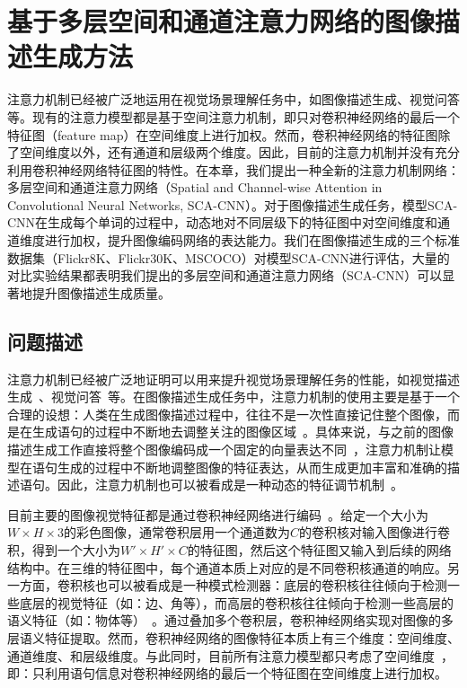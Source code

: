 \chapter{基于多层空间和通道注意力网络的图像描述生成方法}

注意力机制已经被广泛地运用在视觉场景理解任务中，如图像描述生成、视觉问答等。现有的注意力模型都是基于空间注意力机制，即只对卷积神经网络的最后一个特征图（feature map）在空间维度上进行加权。然而，卷积神经网络的特征图除了空间维度以外，还有通道和层级两个维度。因此，目前的注意力机制并没有充分利用卷积神经网络特征图的特性。在本章，我们提出一种全新的注意力机制网络：多层空间和通道注意力网络（Spatial and Channel-wise Attention in Convolutional Neural Networks, SCA-CNN）。对于图像描述生成任务，模型SCA-CNN在生成每个单词的过程中，动态地对不同层级下的特征图中对空间维度和通道维度进行加权，提升图像编码网络的表达能力。我们在图像描述生成的三个标准数据集（Flickr8K、Flickr30K、MSCOCO）对模型SCA-CNN进行评估，大量的对比实验结果都表明我们提出的多层空间和通道注意力网络（SCA-CNN）可以显著地提升图像描述生成质量。


\section{问题描述}

注意力机制已经被广泛地证明可以用来提升视觉场景理解任务的性能，如视觉描述生成~\cite{xu2015show,yao2015describing}、视觉问答~\cite{chen2016abc,yang2016stacked,xu2016ask}等。在图像描述生成任务中，注意力机制的使用主要是基于一个合理的设想：人类在生成图像描述过程中，往往不是一次性直接记住整个图像，而是在生成语句的过程中不断地去调整关注的图像区域~\cite{corbetta2002control}。具体来说，与之前的图像描述生成工作直接将整个图像编码成一个固定的向量表达不同~\cite{vinyals2015show,karpathy2015deep}，注意力机制让模型在语句生成的过程中不断地调整图像的特征表达，从而生成更加丰富和准确的描述语句。因此，注意力机制也可以被看成是一种动态的特征调节机制~\cite{mnih2014recurrent,stollenga2014deep}。

目前主要的图像视觉特征都是通过卷积神经网络进行编码~\cite{he2016deep,simonyan2015very}。给定一个大小为$W\times H\times 3$的彩色图像，通常卷积层用一个通道数为$C$的卷积核对输入图像进行卷积，得到一个大小为$W'\times H'\times C$的特征图，然后这个特征图又输入到后续的网络结构中。在三维的特征图中，每个通道本质上对应的是不同卷积核通道的响应。另一方面，卷积核也可以被看成是一种模式检测器：底层的卷积核往往倾向于检测一些底层的视觉特征（如：边、角等），而高层的卷积核往往倾向于检测一些高层的语义特征（如：物体等）~\cite{zeiler2014visualizing}。通过叠加多个卷积层，卷积神经网络实现对图像的多层语义特征提取。然而，卷积神经网络的图像特征本质上有三个维度：空间维度、通道维度、和层级维度。与此同时，目前所有注意力模型都只考虑了空间维度~\cite{xu2015show}，即：只利用语句信息对卷积神经网络的最后一个特征图在空间维度上进行加权。

